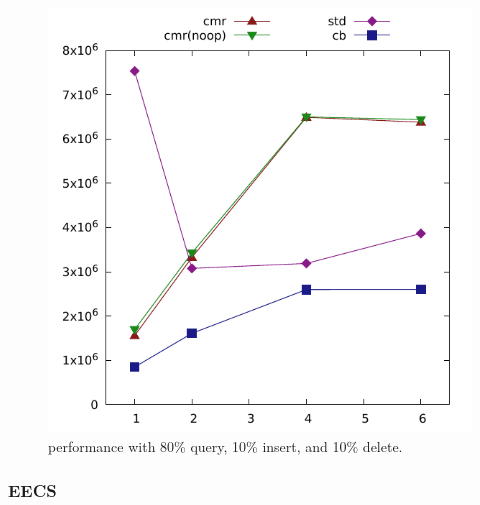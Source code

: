 \begin{figure}[ht]
\centering
\includegraphics[width=0.49\linewidth]{graphs/lurifax-hm-80-10-10.pdf}
\caption{ performance with 80\% query, 10\% insert, and 10\% delete.}
\end{figure}


\subsubsection{EECS}

